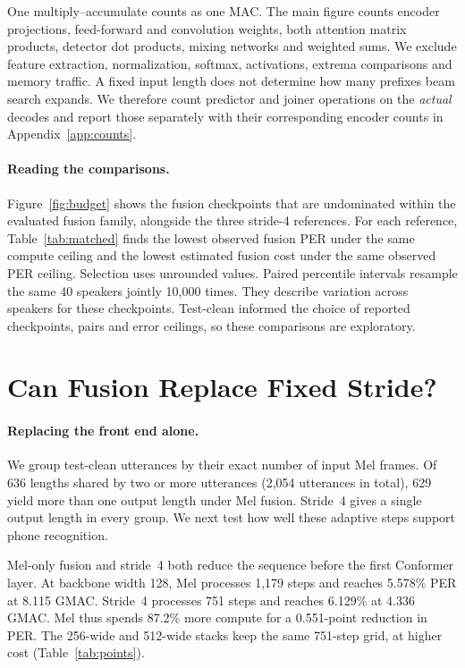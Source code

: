 \documentclass[11pt]{article}
\begin{document}
One multiply--accumulate counts as one MAC. The main figure counts encoder projections, feed-forward and convolution weights, both attention matrix products, detector dot products, mixing networks and weighted sums. We exclude feature extraction, normalization, softmax, activations, extrema comparisons and memory traffic. A fixed input length does not determine how many prefixes beam search expands. We therefore count predictor and joiner operations on the \emph{actual} decodes and report those separately with their corresponding encoder counts in Appendix~\ref{app:counts}.

\paragraph{Reading the comparisons.}
Figure~\ref{fig:budget} shows the fusion checkpoints that are undominated within the evaluated fusion family, alongside the three stride-4 references. For each reference, Table~\ref{tab:matched} finds the lowest observed fusion PER under the same compute ceiling and the lowest estimated fusion cost under the same observed PER ceiling. Selection uses unrounded values. Paired percentile intervals resample the same 40 speakers jointly 10,000 times. They describe variation across speakers for these checkpoints. Test-clean informed the choice of reported checkpoints, pairs and error ceilings, so these comparisons are exploratory.

\section{Can Fusion Replace Fixed Stride?}
\label{sec:results}

\paragraph{Replacing the front end alone.}
We group test-clean utterances by their exact number of input Mel frames. Of 636 lengths shared by two or more utterances (2,054 utterances in total), 629 yield more than one output length under Mel fusion. Stride~4 gives a single output length in every group. We next test how well these adaptive steps support phone recognition.

Mel-only fusion and stride~4 both reduce the sequence before the first Conformer layer. At backbone width 128, Mel processes 1,179 steps and reaches 5.578\% PER at 8.115 GMAC. Stride~4 processes 751 steps and reaches 6.129\% at 4.336 GMAC. Mel thus spends 87.2\% more compute for a 0.551-point reduction in PER. The 256-wide and 512-wide stacks keep the same 751-step grid, at higher cost (Table~\ref{tab:points}).
\end{document}
